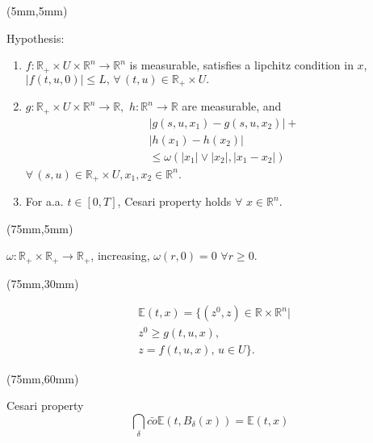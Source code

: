 \begin{frame}[plain]
	\begin{textblock*}{60mm}(5mm,5mm)
		\begin{graybox}{Hypothesis:}
			\begin{enumerate}[(\textbf{{C}}-1)]
				\item<1->
					$
						f:\mathbb{R}_{+}\times U
						\times \mathbb{R}^n\rightarrow 
						\mathbb{R}^n
					$ is measurable, satisfies a lipchitz
					 condition in $x$,
					$
						|f(t,u,0)|\leq L,\,
						 \forall\,(t,u)\in
						 \mathbb{R}_{+}\times U .
					$
				\item<2->
					$
						g:\mathbb{R}_{+}\times U\times 
						\mathbb{R}^n\rightarrow \mathbb{R},
					$ 
					$
						h:\mathbb{R}^n\rightarrow \mathbb{R}
					$ are measurable, and
					\begin{align*}
						&|g(s,u,x_1)-g(s,u,x_2)|+\\
						&|h(x_1)-h(x_2)|\\
						&\leq \omega(|x_1|\vee |x_2|,|x_1-x_2|)
					\end{align*}
					$
						\forall\, (s,u)\in \mathbb{R}_{+}
						\times U,x_1,x_2\in \mathbb{R}^n
					$.
				\item<3->
					For a.a. $t\in[0,T]$, Cesari property holds $\forall$ $x\in \mathbb{R}^n$.
			\end{enumerate}	
		\end{graybox}
	\end{textblock*}
	{
		\begin{textblock*}{50mm}(75mm,5mm)
			\begin{yellowbox}{}
				$\omega:\mathbb{R}_{+}\times\mathbb{R}_{+}\rightarrow \mathbb{R}_{+}$, increasing, $\omega(r,0)=0$ $\forall r\geq 0$.
			\end{yellowbox}
		\end{textblock*}
	}
	{
		\begin{textblock*}{50mm}(75mm,30mm)
			\begin{yellowbox}{}
				\begin{align*}
					&\mathbb{E}(t,x)=\{(z^0,z)\in \mathbb{R}\times \mathbb{R}^n|\\
					&z^0\geq g(t,u,x),\\
					&z=f(t,u,x),\, u\in U\}.
				\end{align*}			
			\end{yellowbox}
		\end{textblock*}
	
		\begin{textblock*}{50mm}(75mm,60mm)
			\begin{yellowbox}{Cesari property}
				\begin{equation*}
				\bigcap_{\delta}\bar{co}\mathbb{E}(t,B_{\delta}(x))=\mathbb{E}(t,x)
				\end{equation*}			
			\end{yellowbox}
		\end{textblock*}
	}
\end{frame}

